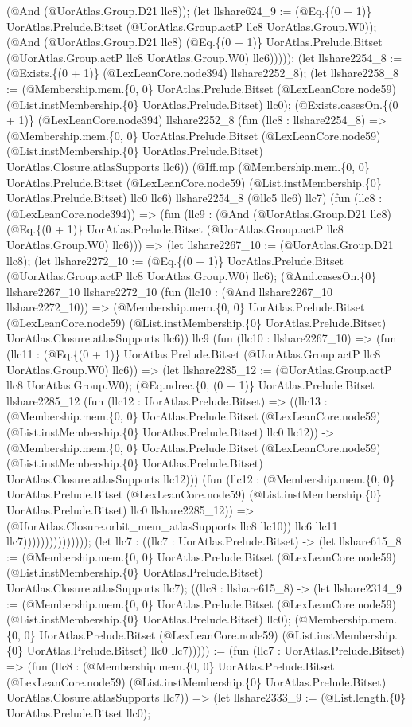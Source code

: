 \documentclass[11pt]{article}
\begin{document}
(@And (@UorAtlas.Group.D21 llc8)); (let llshare624\_9 := (@Eq.\{(0 + 1)\} UorAtlas.Prelude.Bitset (@UorAtlas.Group.actP llc8 UorAtlas.Group.W0)); (@And (@UorAtlas.Group.D21 llc8) (@Eq.\{(0 + 1)\} UorAtlas.Prelude.Bitset (@UorAtlas.Group.actP llc8 UorAtlas.Group.W0) llc6))))); (let llshare2254\_8 := (@Exists.\{(0 + 1)\} (@LexLeanCore.node394) llshare2252\_8); (let llshare2258\_8 := (@Membership.mem.\{0, 0\} UorAtlas.Prelude.Bitset (@LexLeanCore.node59) (@List.instMembership.\{0\} UorAtlas.Prelude.Bitset) llc0); (@Exists.casesOn.\{(0 + 1)\} (@LexLeanCore.node394) llshare2252\_8 (fun (llc8 : llshare2254\_8) => (@Membership.mem.\{0, 0\} UorAtlas.Prelude.Bitset (@LexLeanCore.node59) (@List.instMembership.\{0\} UorAtlas.Prelude.Bitset) UorAtlas.Closure.atlasSupports llc6)) (@Iff.mp (@Membership.mem.\{0, 0\} UorAtlas.Prelude.Bitset (@LexLeanCore.node59) (@List.instMembership.\{0\} UorAtlas.Prelude.Bitset) llc0 llc6) llshare2254\_8 (@llc5 llc6) llc7) (fun (llc8 : (@LexLeanCore.node394)) => (fun (llc9 : (@And (@UorAtlas.Group.D21 llc8) (@Eq.\{(0 + 1)\} UorAtlas.Prelude.Bitset (@UorAtlas.Group.actP llc8 UorAtlas.Group.W0) llc6))) => (let llshare2267\_10 := (@UorAtlas.Group.D21 llc8); (let llshare2272\_10 := (@Eq.\{(0 + 1)\} UorAtlas.Prelude.Bitset (@UorAtlas.Group.actP llc8 UorAtlas.Group.W0) llc6); (@And.casesOn.\{0\} llshare2267\_10 llshare2272\_10 (fun (llc10 : (@And llshare2267\_10 llshare2272\_10)) => (@Membership.mem.\{0, 0\} UorAtlas.Prelude.Bitset (@LexLeanCore.node59) (@List.instMembership.\{0\} UorAtlas.Prelude.Bitset) UorAtlas.Closure.atlasSupports llc6)) llc9 (fun (llc10 : llshare2267\_10) => (fun (llc11 : (@Eq.\{(0 + 1)\} UorAtlas.Prelude.Bitset (@UorAtlas.Group.actP llc8 UorAtlas.Group.W0) llc6)) => (let llshare2285\_12 := (@UorAtlas.Group.actP llc8 UorAtlas.Group.W0); (@Eq.ndrec.\{0, (0 + 1)\} UorAtlas.Prelude.Bitset llshare2285\_12 (fun (llc12 : UorAtlas.Prelude.Bitset) => ((llc13 : (@Membership.mem.\{0, 0\} UorAtlas.Prelude.Bitset (@LexLeanCore.node59) (@List.instMembership.\{0\} UorAtlas.Prelude.Bitset) llc0 llc12)) -> (@Membership.mem.\{0, 0\} UorAtlas.Prelude.Bitset (@LexLeanCore.node59) (@List.instMembership.\{0\} UorAtlas.Prelude.Bitset) UorAtlas.Closure.atlasSupports llc12))) (fun (llc12 : (@Membership.mem.\{0, 0\} UorAtlas.Prelude.Bitset (@LexLeanCore.node59) (@List.instMembership.\{0\} UorAtlas.Prelude.Bitset) llc0 llshare2285\_12)) => (@UorAtlas.Closure.orbit\_mem\_atlasSupports llc8 llc10)) llc6 llc11 llc7))))))))))))))); (let llc7 : ((llc7 : UorAtlas.Prelude.Bitset) -> (let llshare615\_8 := (@Membership.mem.\{0, 0\} UorAtlas.Prelude.Bitset (@LexLeanCore.node59) (@List.instMembership.\{0\} UorAtlas.Prelude.Bitset) UorAtlas.Closure.atlasSupports llc7); ((llc8 : llshare615\_8) -> (let llshare2314\_9 := (@Membership.mem.\{0, 0\} UorAtlas.Prelude.Bitset (@LexLeanCore.node59) (@List.instMembership.\{0\} UorAtlas.Prelude.Bitset) llc0); (@Membership.mem.\{0, 0\} UorAtlas.Prelude.Bitset (@LexLeanCore.node59) (@List.instMembership.\{0\} UorAtlas.Prelude.Bitset) llc0 llc7))))) := (fun (llc7 : UorAtlas.Prelude.Bitset) => (fun (llc8 : (@Membership.mem.\{0, 0\} UorAtlas.Prelude.Bitset (@LexLeanCore.node59) (@List.instMembership.\{0\} UorAtlas.Prelude.Bitset) UorAtlas.Closure.atlasSupports llc7)) => (let llshare2333\_9 := (@List.length.\{0\} UorAtlas.Prelude.Bitset llc0); 
\end{document}
